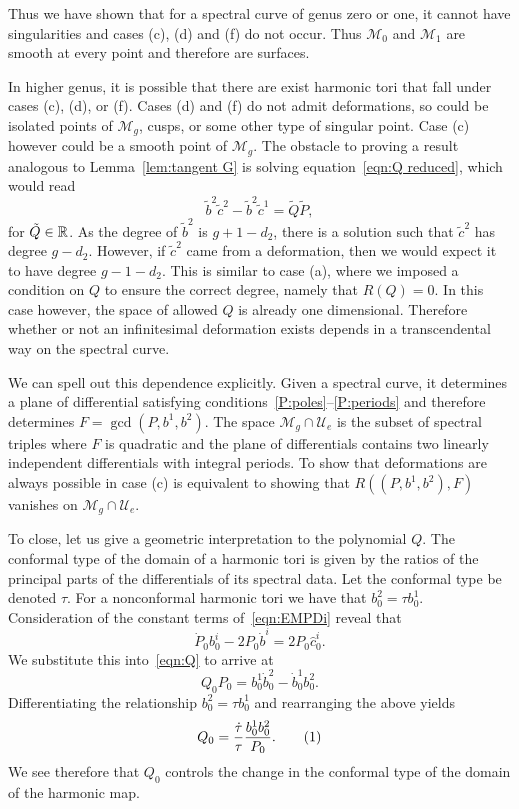 \documentclass{article}
\begin{document}
Thus we have shown that for a spectral curve of genus zero or one, it cannot have singularities and cases (c), (d) and (f) do not occur. Thus $\mathcal{M}_0$ and $\mathcal{M}_1$ are smooth at every point and therefore are surfaces.

In higher genus, it is possible that there are exist harmonic tori that fall under cases (c), (d), or (f). Cases (d) and (f) do not admit deformations, so could be isolated points of $\mathcal{M}_g$, cusps, or some other type of singular point. Case (c) however could be a smooth point of $\mathcal{M}_g$. The obstacle to proving a result analogous to Lemma~\ref{lem:tangent G} is solving equation~\eqref{eqn:Q reduced}, which would read
\[
\tilde{b}^2\tilde{c}^2 - \tilde{b}^2\tilde{c}^1 =\tilde{Q}\tilde{P},
\]
for $\tilde{Q}\in\mathbb{R}$. As the degree of $\tilde{b}^2$ is $g+1-d_2$, there is a solution such that $\tilde{c}^2$ has degree $g-d_2$. However, if $\tilde{c}^2$ came from a deformation, then we would expect it to have degree $g-1-d_2$. This is similar to case (a), where we imposed a condition on $Q$ to ensure the correct degree, namely that $R(Q)=0$. In this case however, the space of allowed $Q$ is already one dimensional. Therefore whether or not an infinitesimal deformation exists depends in a transcendental way on the spectral curve.

We can spell out this dependence explicitly. Given a spectral curve, it determines a plane of differential satisfying conditions~\ref{P:poles}--\ref{P:periods} and therefore determines $F=\gcd(P,b^1,b^2)$. The space $\mathcal{M}_g\cap \mathcal{U}_{e}$ is the subset of spectral triples where $F$ is quadratic and the plane of differentials contains two linearly independent differentials with integral periods. To show that deformations are always possible in case (c) is equivalent to showing that $R((P,b^1,b^2),F)$ vanishes on $\mathcal{M}_g\cap \mathcal{U}_{e}$.

To close, let us give a geometric interpretation to the polynomial $Q$. The conformal type of the domain of a harmonic tori is given by the ratios of the principal parts of the differentials of its spectral data. Let the conformal type be denoted $\tau$. For a nonconformal harmonic tori we have that $b^2_0 = \tau b^1_0$. Consideration of the constant terms of~\eqref{eqn:EMPDi} reveal that
\[
\dot{P}_0b^i_0 -2P_0 \dot{b}^i = 2P_0\hat{c}^i_0.
\]
We substitute this into~\eqref{eqn:Q} to arrive at
\[
Q_0 P_0 
= b^1_0 \dot{b}^2_0 - \dot{b}^1_0 b^2_0.
\]
Differentiating the relationship $b^2_0 = \tau b^1_0$ and rearranging the above yields
\[
Q_0 = \frac{\dot{\tau}}{\tau} \frac{b^1_0 b^2_0}{P_0}.
\labelthis{eqn:Q0 change conformal}
\]
We see therefore that $Q_0$ controls the change in the conformal type of the domain of the harmonic map.





\end{document}
